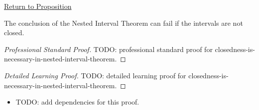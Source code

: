 \newpage
{}
\label{prf:closedness-is-necessary-in-nested-interval-theorem}

\begin{remark*}[Return]
\hyperref[prop:closedness-is-necessary-in-nested-interval-theorem]{Return to Proposition}
\end{remark*}

\begin{proposition*}
The conclusion of the Nested Interval Theorem can fail if the intervals are
not closed.
\end{proposition*}

\begin{proof}[Professional Standard Proof]
\LRAProofBodyStart
TODO: professional standard proof for closedness-is-necessary-in-nested-interval-theorem.
\end{proof}

\begin{proof}[Detailed Learning Proof]
\LRAProofBodyStart
TODO: detailed learning proof for closedness-is-necessary-in-nested-interval-theorem.
\end{proof}

\begin{remark*}
\end{remark*}

\begin{dependencies}
\begin{itemize}
  \item TODO: add dependencies for this proof.
\end{itemize}
\end{dependencies}

\clearpage
